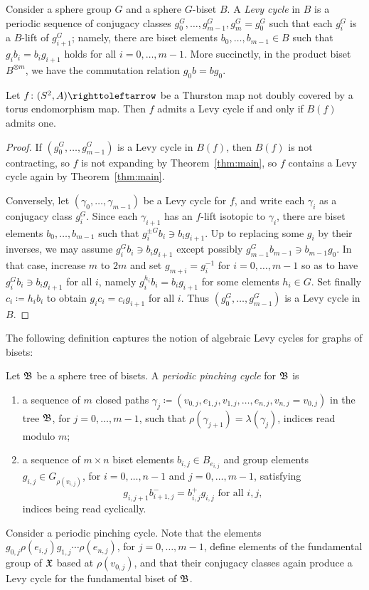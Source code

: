 \documentclass{amsart}
\begin{document}
Consider a sphere group $G$ and a sphere $G$-biset $B$. A \emph{Levy
  cycle} in $B$ is a periodic sequence of conjugacy classes
$g_0^G,\dots,g_{m-1}^G,g_m^G=g_0^G$ such that each $g_i^G$ is a
$B$-lift of $g_{i+1}^G$; namely, there are biset elements
$b_0,\dots,b_{m-1}\in B$ such that $g_i b_i=b_i g_{i+1}$ holds for all
$i=0,\dots,m-1$. More succinctly, in the product biset $B^{\otimes m}$,
we have the commutation relation $g_0 b=b g_0$.
\begin{lem}
  Let $f\colon(S^2,A)\selfmap$ be a Thurston map not doubly covered by
  a torus endomorphism map. Then $f$ admits a Levy cycle if and only
  if $B(f)$ admits one.
\end{lem}
\begin{proof}
  If $(g_0^G,\dots,g_{m-1}^G)$ is a Levy cycle in $B(f)$, then $B(f)$
  is not contracting, so $f$ is not expanding by
  Theorem~\ref{thm:main}, so $f$ contains a Levy cycle again by
  Theorem~\ref{thm:main}.

  Conversely, let $(\gamma_0,\dots,\gamma_{m-1})$ be a Levy cycle for
  $f$, and write each $\gamma_i$ as a conjugacy class $g_i^G$. Since
  each $\gamma_{i+1}$ has an $f$-lift isotopic to $\gamma_i$, there
  are biset elements $b_0,\dots,b_{m-1}$ such that
  $g_i^{\pm G}b_i\ni b_i g_{i+1}$. Up to replacing some $g_i$ by their
  inverses, we may assume $g_i^G b_i\ni b_i g_{i+1}$ except possibly
  $g_{m-1}^G b_{m-1}\ni b_{m-1}g_0$. In that case, increase $m$ to
  $2m$ and set $g_{m+i}=g_i^{-1}$ for $i=0,\dots,m-1$ so as to have
  $g_i^G b_i\ni b_i g_{i+1}$ for all $i$, namely
  $g_i^{h_i}b_i=b_i g_{i+1}$ for some elements $h_i\in G$. Set finally
  $c_i\coloneqq h_i b_i$ to obtain $g_i c_i=c_i g_{i+1}$ for all
  $i$. Thus $(g_0^G,\dots,g_{m-1}^G)$ is a Levy cycle in $B$.
\end{proof}

The following definition captures the notion of algebraic Levy cycles
for graphs of bisets:
\begin{defn}\label{defn:rpc}
  Let ${\mathfrak B}$ be a sphere tree of bisets.  A \emph{periodic
    pinching cycle} for ${\mathfrak B}$ is
  \begin{enumerate}
  \item a sequence of $m$ closed paths
    $\gamma_j\coloneqq(v_{0,j},e_{1,j},v_{1,j},\dots,e_{n,j},v_{n,j}=v_{0,j})$
    in the tree ${\mathfrak B}$, for $j=0,\dots,m-1$, such that
    $\rho(\gamma_{j+1})=\lambda(\gamma_j)$, indices read modulo $m$;
  \item a sequence of $m\times n$ biset elements
    $b_{i,j}\in B_{e_{i,j}}$ and group elements
    $g_{i,j}\in G_{\rho(v_{i,j})}$, for $i=0,\dots,n-1$ and
    $j=0,\dots,m-1$, satisfying
    \[g_{i,j+1} b_{i+1,j}^-=b_{i,j}^+ g_{i,j}\text{ for all $i,j$},\]
    indices being read cyclically.\qedhere
  \end{enumerate}
\end{defn}
Consider a periodic pinching cycle. Note that the elements
$g_{0,j}\rho(e_{i,j})g_{1,j}\cdots\rho(e_{n,j})$, for $j=0,\dots,m-1$,
define elements of the fundamental group of ${\mathfrak X}$ based at
$\rho(v_{0,j})$, and that their conjugacy classes again produce a Levy
cycle for the fundamental biset of ${\mathfrak B}$.
\end{document}
